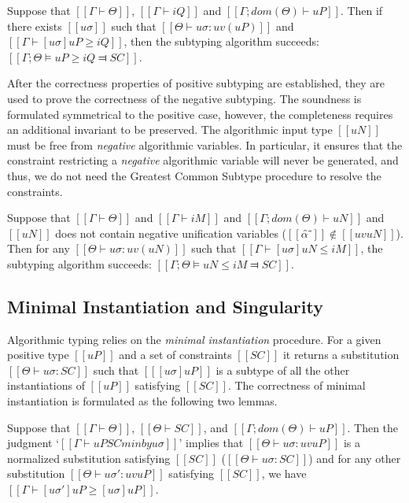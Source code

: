 \begin{lemma*}
    Suppose that $[[Γ ⊢ Θ]]$, $[[Γ ⊢ iQ]]$ and $[[Γ ; dom(Θ) ⊢  uP]]$.
    Then if there exists $[[uσ]]$ such that $[[Θ ⊢ uσ : uv(uP)]]$ and $[[ Γ ⊢ [uσ]uP ≥ iQ ]]$,
    then the subtyping algorithm succeeds: $[[Γ; Θ ⊨ uP ≥ iQ ⫤ SC]]$.
\end{lemma*}

After the correctness properties of positive subtyping are established,
they are used to prove the correctness of the negative subtyping.
The soundness is formulated symmetrical to the positive case,
however, the completeness requires an additional invariant to be preserved.
The algorithmic input type $[[uN]]$ must be free from \emph{negative} algorithmic variables.
In particular, it ensures that the constraint restricting a \emph{negative} algorithmic
variable will never be generated, and thus, we do not need the 
Greatest Common Subtype procedure to resolve the constraints.

\begin{lemma*}
    Suppose that $[[Γ ⊢ Θ]]$ and $[[Γ ⊢ iM]]$ and $[[Γ ; dom(Θ) ⊢ uN]]$
    and $[[uN]]$ does not contain negative unification variables ($[[α̂⁻]] \notin [[uv uN]]$).
    Then for any $[[Θ ⊢ uσ : uv(uN)]]$ such that $[[Γ ⊢ [uσ]uN ≤ iM]]$,
    the subtyping algorithm succeeds: $[[Γ ; Θ ⊨ uN ≤ iM ⫤ SC]]$.
\end{lemma*}

\subsection{Minimal Instantiation and Singularity}
\label{sec:singularity-proof}

Algorithmic typing relies on the \emph{minimal instantiation} procedure.
For a given positive type $[[uP]]$ and a set of constraints $[[SC]]$
it returns a substitution $[[Θ ⊢ uσ : SC]]$ such that
$[[ [uσ]uP ]]$ is a subtype of all the other instantiations of $[[uP]]$ satisfying $[[SC]]$.
The correctness of minimal instantiation is formulated as the following two lemmas.

\begin{lemma*}
    \label{lemma:minimal-instantiation-soundness}
    Suppose that $[[Γ ⊢ Θ]]$, $[[Θ ⊢ SC]]$, and $[[Γ; dom(Θ) ⊢ uP]]$.
    Then the judgment `$[[Γ ⊢ uP SC minby uσ ]]$' implies that 
    $[[Θ ⊢ uσ : uv uP]]$ is a normalized substitution satisfying $[[SC]]$
    (\ie $[[Θ ⊢ uσ : SC]]$)
    and for any other substitution $[[Θ ⊢ uσ' : uv uP ]]$ satisfying $[[SC]]$,
    we have $[[Γ ⊢ [uσ']uP ≥ [uσ]uP ]]$.
\end{lemma*}

